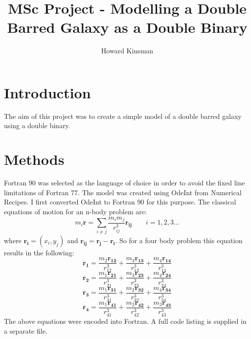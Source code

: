 \documentclass[a4paper,12pt]{article}
\author{Howard Kinsman}
\title{MSc Project - Modelling a Double Barred Galaxy as a Double Binary}
\begin{document}
\maketitle
\section{Introduction}
The aim of this project was to create a simple model of a double barred galaxy using a double binary.

\section{Methods}
Fortran 90 was selected as the language of choice in order to avoid the fixed line limitations of Fortran 77.
The model was created using OdeInt from Numerical Recipes. I first converted OdeInt to Fortran 90 for this purpose.
\newline
The classical equations of motion for an n-body problem are:
\begin{equation}
m_i\mathbf{\ddot{r}}=\sum_{i\neq{j}}\frac{{m_i}{m_j}}{r^3_{ij}}\mathbf{r_{ij}}
\qquad
i=1,2,3...
\end{equation}
where $\mathbf{r_i}=\left(x_i,y_j\right)$ and $\mathbf{r_{ij}}=\mathbf{r_j}-\mathbf{r_i}$. So for a four body problem 
this equation results in the following:
\begin{equation}
\ddot{\mathbf{r_1}}=\frac{m_2\mathbf{r_{12}}}{r^3_{12}}+\frac{m_3\mathbf{r_{13}}}{r^3_{13}}+\frac{m_4\mathbf{r_{14}}}{r^3_{14}}
\end{equation}
\begin{equation}
\ddot{\mathbf{r_2}}=\frac{m_1\mathbf{r_{21}}}{r^3_{21}}+\frac{m_3\mathbf{r_{23}}}{r^3_{23}}+\frac{m_4\mathbf{r_{24}}}{r^3_{24}}
\end{equation}
\begin{equation}
\ddot{\mathbf{r_3}}=\frac{m_1\mathbf{r_{31}}}{r^3_{31}}+\frac{m_2\mathbf{r_{32}}}{r^3_{32}}+\frac{m_4\mathbf{r_{34}}}{r^3_{34}}
\end{equation}
\begin{equation}
\ddot{\mathbf{r_4}}=\frac{m_1\mathbf{r_{41}}}{r^3_{41}}+\frac{m_2\mathbf{r_{42}}}{r^3_{42}}+\frac{m_3\mathbf{r_{43}}}{r^3_{43}}
\end{equation}
The above equations were encoded into Fortran. A full code listing is supplied in a separate file.
\end{document}
